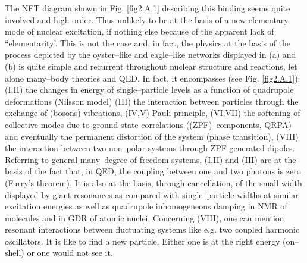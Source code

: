 \begin{subappendices}
The NFT diagram shown in Fig. \ref{fig2.A.1} describing this binding seems quite involved and high order. Thus unlikely to be at the basis of a new elementary mode of nuclear excitation, if nothing else because of the apparent lack of ``elementarity'. This is not the case and, in fact, the physics at the basis of the process depicted by the oyster--like and eagle--like networks displayed in (a) and (b) is quite simple and recurrent throughout nuclear structure and reactions, let alone many--body theories and QED. In fact, it encompasses (see Fig. \ref{fig2.A.1}): (I,II) the changes in energy of single--particle levels as a function of quadrupole deformations (Nilsson model) (III) the interaction between particles through the exchange of (bosons) vibrations, (IV,V) Pauli principle, (VI,VII) the softening of collective modes due to ground state correlations ((ZPF)--components, QRPA) and eventually the permanent distortion of the system (phase transition), (VIII) the interaction between two non--polar systems through ZPF generated dipoles. Referring to general many--degree of freedom systems, (I,II) and (III) are at the basis of the fact that, in QED, the coupling between one and two photons is zero (Furry's theorem). It is also at the basis, through cancellation, of the small width displayed by giant resonances as compared with single--particle widths at similar excitation energies as well as quadrupole inhomogeneous damping   in NMR of molecules  and in GDR of atomic nuclei. Concerning (VIII), one can mention resonant interactions between fluctuating systems like e.g. two coupled harmonic oscillators. It is like to find a new particle. Either one is at the right energy (on--shell) or one would not see it.


\end{subappendices}
